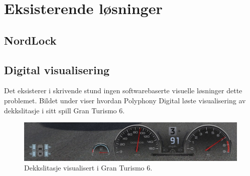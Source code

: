 \section{Eksisterende løsninger}
\subsection{NordLock}

\subsection{Digital visualisering}
Det eksisterer i skrivende stund ingen softwarebaserte visuelle løsninger dette 
problemet. Bildet under viser hvordan Polyphony Digital løste visualisering av 
dekkslitasje i sitt spill Gran Turismo 6. 
	\newline
	\begin{figure}[H]
		\centering
		\includegraphics[width=1.00\textwidth]{images/gran-turismo-6-screenshot.jpg}
		\caption{Dekkslitasje visualisert i Gran Turismo 6.}
	\end{figure}
